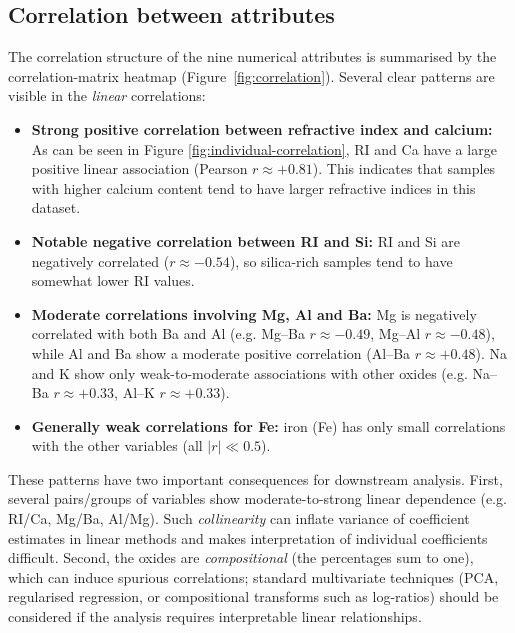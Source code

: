 \documentclass[dtu]{dtuarticle}
\begin{document}
	\subsection{Correlation between attributes}

	\label{section:correlation}

	The correlation structure of the nine numerical attributes is summarised by the correlation-matrix
	heatmap (Figure~\ref{fig:correlation}).  Several clear patterns are visible in the \textit{linear} correlations:

	\begin{itemize}
	  \item \textbf{Strong positive correlation between refractive index and calcium:} As can be seen in Figure \ref{fig:individual-correlation}, RI and Ca have a large
	    positive linear association (Pearson $r \approx +0.81$). This indicates that samples with higher
	    calcium content tend to have larger refractive indices in this dataset.
	  \item \textbf{Notable negative correlation between RI and Si:} RI and Si are negatively correlated
	    ($r \approx -0.54$), so silica-rich samples tend to have somewhat lower RI values.
	  \item \textbf{Moderate correlations involving Mg, Al and Ba:} Mg is negatively correlated with both Ba
	    and Al (e.g. Mg--Ba $r\approx -0.49$, Mg--Al $r\approx -0.48$), while Al and Ba show a moderate
	    positive correlation (Al--Ba $r\approx +0.48$). Na and K show only weak-to-moderate associations
	    with other oxides (e.g. Na--Ba $r\approx +0.33$, Al--K $r\approx +0.33$).
	  \item \textbf{Generally weak correlations for Fe:} iron (Fe) has only small correlations with the other
	    variables (all $|r| \ll 0.5$).
	\end{itemize}

	These patterns have two important consequences for downstream analysis. First, several pairs/groups of
	variables show moderate-to-strong linear dependence (e.g. RI/Ca, Mg/Ba, Al/Mg). Such \textit{collinearity} can
	inflate variance of coefficient estimates in linear methods and makes interpretation of individual
	coefficients difficult. Second, the oxides are \textit{compositional} (the percentages sum to one), which
	can induce spurious correlations; standard multivariate techniques (PCA, regularised regression, or
	compositional transforms such as log-ratios) should be considered if the analysis requires interpretable
	linear relationships.
\end{document}
